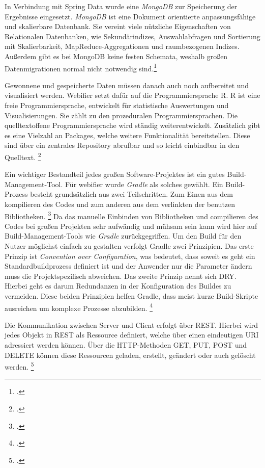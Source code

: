 In Verbindung mit Spring Data wurde eine \textit{MongoDB} zur Speicherung der Ergebnisse eingesetzt. \textit{MongoDB} ist eine Dokument orientierte anpassungsfähige und skalierbare Datenbank. Sie vereint viele nützliche Eigenschaften von Relationalen Datenbanken, wie Sekundärindizes, Auswahlabfragen und Sortierung mit Skalierbarkeit, MapReduce-Aggregationen und raumbezogenen Indizes. Außerdem gibt es bei MongoDB keine festen Schemata, weshalb großen Datenmigrationen normal nicht notwendig sind.\footcite[Vgl.][1f]{mongodb}

Gewonnene und gespeicherte Daten müssen danach auch noch aufbereitet und visualisiert werden. Webifier setzt dafür auf die Programmiersprache R. R ist eine freie Programmiersprache, entwickelt für statistische Auswertungen und Visualisierungen. Sie zählt zu den prozeduralen Programmiersprachen. Die quelltextoffene Programmiersprache wird ständig weiterentwickelt. Zusätzlich gibt es eine Vielzahl an Packages, welche weitere Funktionalität bereitstellen. Diese sind über ein zentrales Repository abrufbar und so leicht einbindbar in den Quelltext. \footcite[Vgl.][1ff]{R}

Ein wichtiger Bestandteil jedes großen Software-Projektes ist ein gutes Build-Management-Tool. Für webifier wurde \textit{Gradle} als solches gewählt. Ein Build-Prozess besteht grundsätzlich aus zwei Teilschritten. Zum Einen aus dem kompilieren des Codes und zum anderen aus dem verlinkten der benutzen Bibliotheken. \footcite[Vgl.][]{buildprozess}
Da das manuelle Einbinden von Bibliotheken und compilieren des Codes bei großen Projekten sehr aufwändig und mühsam sein kann wird hier auf Build-Management-Tools wie \textit{Gradle} zurückgegriffen. Um den Build für den Nutzer möglichst einfach zu gestalten verfolgt Gradle zwei Prinzipien. Das erste Prinzip ist \textit{Convention over Configuration}, was bedeutet, dass soweit es geht ein Standardbuildprozess definiert ist und der Anwender nur die Parameter ändern muss die Projektspezifisch abweichen. Das zweite Prinzip nennt sich \ac{DRY}. Hierbei geht es darum Redundanzen in der Konfiguration des Buildes zu vermeiden. Diese beiden Prinzipien helfen Gradle, dass meist kurze Build-Skripte ausreichen um komplexe Prozesse abzubilden. \footcite[Vgl.][6f]{gradle}

Die Kommunikation zwischen Server und Client erfolgt über \ac{REST}. Hierbei wird jedes Objekt in \ac{REST} als Ressource definiert, welche über einen eindeutigen \ac{URI} adressiert werden können. Über die HTTP-Methoden GET, PUT, POST und DELETE können diese Ressourcen geladen, erstellt, geändert oder auch gelöscht werden. \footcite[Vgl.][]{rest}

